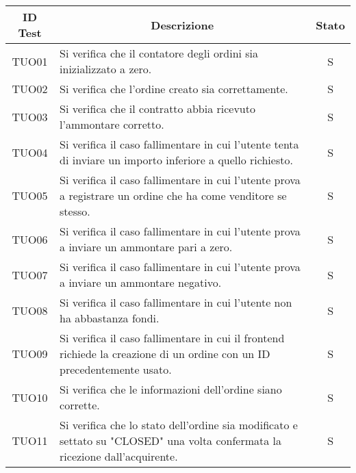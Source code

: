 \begin{table}[H]
  \centering
  \renewcommand{\arraystretch}{1.8}
  \begin{tabular}{c|p{10cm}|c}
    \rowcolor[HTML]{125E28}
    \color[HTML]{FFFFFF}\textbf{ID Test}
         & \multicolumn{1}{c}{\color[HTML]{FFFFFF}\textbf{Descrizione}}
         & \color[HTML]{FFFFFF}\textbf{Stato}                                                                                                    \\
    \hline
    TUO01 & Si verifica che il contatore degli ordini sia inizializzato a zero.                                                               & S \\
    TUO02 & Si verifica che l'ordine creato sia correttamente.                                                                                & S \\
    TUO03 & Si verifica che il contratto abbia ricevuto l'ammontare corretto.                                                                 & S \\
    TUO04 & Si verifica il caso fallimentare in cui l'utente tenta di inviare un importo inferiore a quello richiesto.                        & S \\
    TUO05 & Si verifica il caso fallimentare in cui l'utente prova a registrare un ordine che ha come venditore se stesso.                    & S \\
    TUO06 & Si verifica il caso fallimentare in cui l'utente prova a inviare un ammontare pari a zero.                                        & S \\
    TUO07 & Si verifica il caso fallimentare in cui l'utente prova a inviare un ammontare negativo.                                           & S \\
    TUO08 & Si verifica il caso fallimentare in cui l'utente non ha abbastanza fondi.                                                         & S \\
    TUO09 & Si verifica il caso fallimentare in cui il frontend\glo{} richiede la creazione di un ordine con un ID precedentemente usato.     & S \\
    TUO10 & Si verifica che le informazioni dell'ordine siano corrette.                                                                       & S \\
    TUO11 & Si verifica che lo stato dell'ordine sia modificato e settato su "CLOSED" una volta confermata la ricezione dall'acquirente.      & S \\

\end{tabular}
\end{table}
